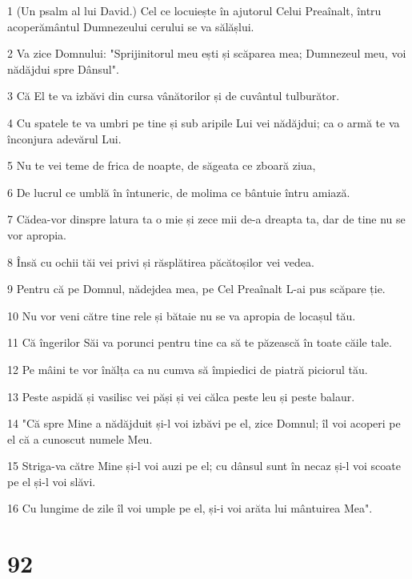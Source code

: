 \par 1 (Un psalm al lui David.) Cel ce locuiește în ajutorul Celui Preaînalt, întru acoperământul Dumnezeului cerului se va sălășlui.
\par 2 Va zice Domnului: "Sprijinitorul meu ești și scăparea mea; Dumnezeul meu, voi nădăjdui spre Dânsul".
\par 3 Că El te va izbăvi din cursa vânătorilor și de cuvântul tulburător.
\par 4 Cu spatele te va umbri pe tine și sub aripile Lui vei nădăjdui; ca o armă te va înconjura adevărul Lui.
\par 5 Nu te vei teme de frica de noapte, de săgeata ce zboară ziua,
\par 6 De lucrul ce umblă în întuneric, de molima ce bântuie întru amiază.
\par 7 Cădea-vor dinspre latura ta o mie și zece mii de-a dreapta ta, dar de tine nu se vor apropia.
\par 8 Însă cu ochii tăi vei privi și răsplătirea păcătoșilor vei vedea.
\par 9 Pentru că pe Domnul, nădejdea mea, pe Cel Preaînalt L-ai pus scăpare ție.
\par 10 Nu vor veni către tine rele și bătaie nu se va apropia de locașul tău.
\par 11 Că îngerilor Săi va porunci pentru tine ca să te păzească în toate căile tale.
\par 12 Pe mâini te vor înălța ca nu cumva să împiedici de piatră piciorul tău.
\par 13 Peste aspidă și vasilisc vei păși și vei călca peste leu și peste balaur.
\par 14 "Că spre Mine a nădăjduit și-l voi izbăvi pe el, zice Domnul; îl voi acoperi pe el că a cunoscut numele Meu.
\par 15 Striga-va către Mine și-l voi auzi pe el; cu dânsul sunt în necaz și-l voi scoate pe el și-l voi slăvi.
\par 16 Cu lungime de zile îl voi umple pe el, și-i voi arăta lui mântuirea Mea".

\chapter{92}

